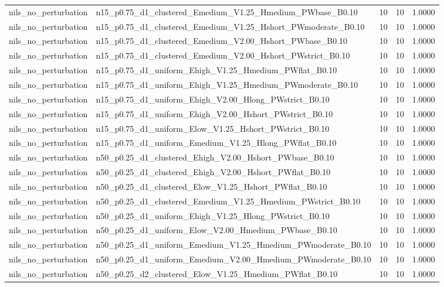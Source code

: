 \begin{tabular}{llrrr}
nils_no_perturbation & n15_p0.75_d1_clustered_Emedium_V1.25_Hmedium_PWbase_B0.10 & 10 & 10 & 1.0000 \\
nils_no_perturbation & n15_p0.75_d1_clustered_Emedium_V1.25_Hshort_PWmoderate_B0.10 & 10 & 10 & 1.0000 \\
nils_no_perturbation & n15_p0.75_d1_clustered_Emedium_V2.00_Hshort_PWbase_B0.10 & 10 & 10 & 1.0000 \\
nils_no_perturbation & n15_p0.75_d1_clustered_Emedium_V2.00_Hshort_PWstrict_B0.10 & 10 & 10 & 1.0000 \\
nils_no_perturbation & n15_p0.75_d1_uniform_Ehigh_V1.25_Hmedium_PWflat_B0.10 & 10 & 10 & 1.0000 \\
nils_no_perturbation & n15_p0.75_d1_uniform_Ehigh_V1.25_Hmedium_PWmoderate_B0.10 & 10 & 10 & 1.0000 \\
nils_no_perturbation & n15_p0.75_d1_uniform_Ehigh_V2.00_Hlong_PWstrict_B0.10 & 10 & 10 & 1.0000 \\
nils_no_perturbation & n15_p0.75_d1_uniform_Ehigh_V2.00_Hshort_PWstrict_B0.10 & 10 & 10 & 1.0000 \\
nils_no_perturbation & n15_p0.75_d1_uniform_Elow_V1.25_Hshort_PWstrict_B0.10 & 10 & 10 & 1.0000 \\
nils_no_perturbation & n15_p0.75_d1_uniform_Emedium_V1.25_Hlong_PWflat_B0.10 & 10 & 10 & 1.0000 \\
nils_no_perturbation & n50_p0.25_d1_clustered_Ehigh_V2.00_Hshort_PWbase_B0.10 & 10 & 10 & 1.0000 \\
nils_no_perturbation & n50_p0.25_d1_clustered_Ehigh_V2.00_Hshort_PWflat_B0.10 & 10 & 10 & 1.0000 \\
nils_no_perturbation & n50_p0.25_d1_clustered_Elow_V1.25_Hshort_PWflat_B0.10 & 10 & 10 & 1.0000 \\
nils_no_perturbation & n50_p0.25_d1_clustered_Emedium_V1.25_Hmedium_PWstrict_B0.10 & 10 & 10 & 1.0000 \\
nils_no_perturbation & n50_p0.25_d1_uniform_Ehigh_V1.25_Hlong_PWstrict_B0.10 & 10 & 10 & 1.0000 \\
nils_no_perturbation & n50_p0.25_d1_uniform_Elow_V2.00_Hmedium_PWbase_B0.10 & 10 & 10 & 1.0000 \\
nils_no_perturbation & n50_p0.25_d1_uniform_Emedium_V1.25_Hmedium_PWmoderate_B0.10 & 10 & 10 & 1.0000 \\
nils_no_perturbation & n50_p0.25_d1_uniform_Emedium_V2.00_Hmedium_PWmoderate_B0.10 & 10 & 10 & 1.0000 \\
nils_no_perturbation & n50_p0.25_d2_clustered_Elow_V1.25_Hmedium_PWflat_B0.10 & 10 & 10 & 1.0000 \\

\end{tabular}
